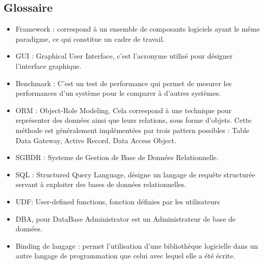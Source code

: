 \documentclass[a4paper]{report}
\begin{document}
\subsection{Glossaire}
\begin{itemize}

\item{Framework : correspond à un ensemble de composants logiciels ayant le même paradigme, ce qui constitue un cadre de travail.} \\

\item{GUI : Graphical User Interface, c'est l'acronyme utilisé pour désigner l'interface graphique.}\\

\item{Benchmark : C'est un test de performance qui permet de mesurer les performances d'un système pour le comparer à d'autres systèmes.}\\

\item{ORM : Object-Role Modeling. Cela correspond à une technique pour représenter des données ainsi que leurs relations, sous forme d'objets. Cette méthode est généralement implémentées par trois pattern possibles : Table Data Gateway, Active Record, Data Access Object.}\\

\item{SGBDR : Systeme de Gestion de Base de Données Relationnelle.}\\

\item{SQL : Structured Query Language, désigne un langage de requête structurée servant à exploiter des bases de données relationnelles.}\\

\item{UDF: User-defined functions, fonction définies par les utilisateurs}\\

\item{DBA, pour DataBase Administrator est un Administrateur de base de données.} \\

\item{Binding de langage : permet l'utilisation d'une bibliothèque logicielle dans un autre langage de programmation que celui avec lequel elle a été écrite.}


\end{itemize}



\end{document}
